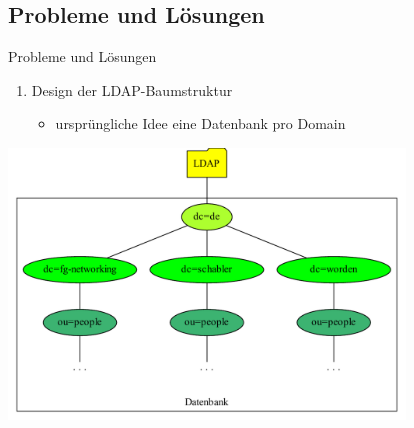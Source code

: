 \documentclass[presentation,svgnames,12pt]{beamer}
\begin{document}
\subsection{Probleme und Lösungen}
\begin{frame}{Probleme und Lösungen}
\begin{enumerate}
	\item Design der LDAP-Baumstruktur
	\vspace{6pt}
	\begin{itemize}
		\item ursprüngliche Idee eine Datenbank pro Domain%
	\end{itemize}
\end{enumerate}
\vspace{2pt}
\centering
\includegraphics[width=0.79\textwidth]{Bilder/LDAP-fgn.pdf}
\end{frame}
\end{document}
